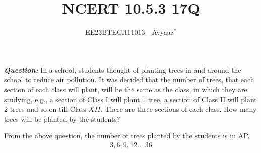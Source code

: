 \documentclass[journal,12pt,twocolumn]{IEEEtran}
\theoremstyle{remark}
\begin{document}

\vspace{3cm}

\title{NCERT 10.5.3 17Q}
\author{EE23BTECH11013 - Avyaaz$^{*}$%
}
\maketitle
\newpage
\bigskip

\renewcommand{\thefigure}{\arabic{figure}}
\renewcommand{\thetable}{\arabic{table}}

\large\textbf{\textsl{Question:}}
In a school, students thought of planting trees in and around the school to reduce air
pollution. It was decided that the number of trees, that each section of each class will
plant, will be the same as the class, in which they are studying, e.g., a section of Class I
will plant $1$ tree, a section of Class II will plant $2$ trees and so on till Class $XII$. There are
three sections of each class. How many trees will be planted by the students?\\
\solution

From the above question, the number of trees planted by the students is in AP.
\begin{align}
 3, 6, 9, 12 .... 36   
\end{align}
\begin{table}[htbp]
\setlength{\extrarowheight}{8pt}
\centering

\caption{}
\label{tab:parameter.10.5.3.17}
\end{table}
\end{document}
